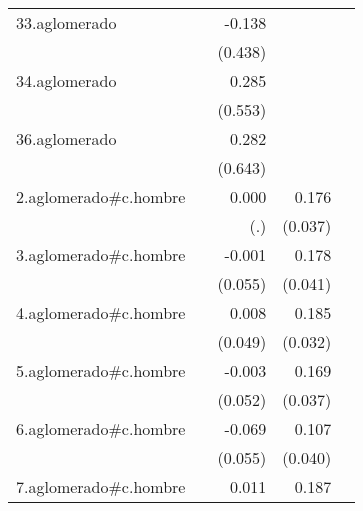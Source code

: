 {\begin{longtable}{l*{4}{D{.}{.}{-1}}}
\addlinespace
33.aglomerado&                     &      -0.138         &                     &                     \\
            &                     &     (0.438)         &                     &                     \\
\addlinespace
34.aglomerado&                     &       0.285         &                     &                     \\
            &                     &     (0.553)         &                     &                     \\
\addlinespace
36.aglomerado&                     &       0.282         &                     &                     \\
            &                     &     (0.643)         &                     &                     \\
\addlinespace
2.aglomerado#c.hombre&                     &       0.000         &       0.176\sym{***}&                     \\
            &                     &         (.)         &     (0.037)         &                     \\
\addlinespace
3.aglomerado#c.hombre&                     &      -0.001         &       0.178\sym{***}&                     \\
            &                     &     (0.055)         &     (0.041)         &                     \\
\addlinespace
4.aglomerado#c.hombre&                     &       0.008         &       0.185\sym{***}&                     \\
            &                     &     (0.049)         &     (0.032)         &                     \\
\addlinespace
5.aglomerado#c.hombre&                     &      -0.003         &       0.169\sym{***}&                     \\
            &                     &     (0.052)         &     (0.037)         &                     \\
\addlinespace
6.aglomerado#c.hombre&                     &      -0.069         &       0.107\sym{**} &                     \\
            &                     &     (0.055)         &     (0.040)         &                     \\
\addlinespace
7.aglomerado#c.hombre&                     &       0.011         &       0.187\sym{***}&                     \\

\end{longtable}}
